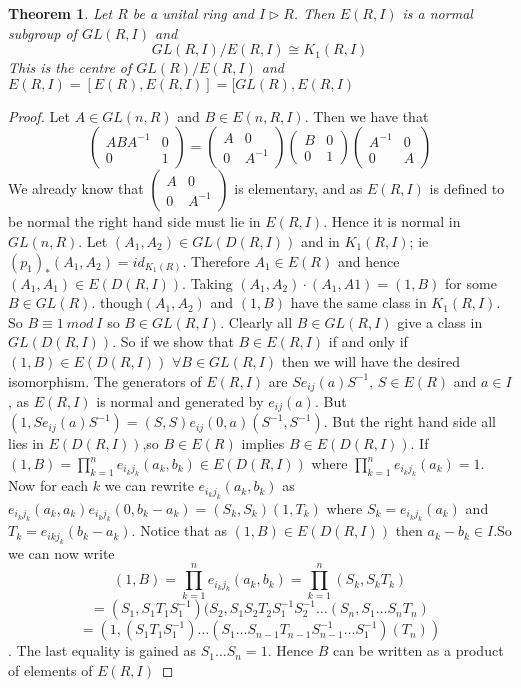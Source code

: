 \documentclass[a4paper,10pt]{article}
\newtheorem{thm}{Theorem}[subsection]
\begin{document}
\begin{thm}
Let $R$ be a unital ring and $I\triangleright R$. Then $E(R,I)$ is a normal subgroup of $GL(R,I)$ and $$GL(R,I)/E(R,I)\cong K_{1}(R,I)$$
This is the centre of $GL(R)/E(R,I)$ and $E(R,I)=[E(R),E(R,I)]=[GL(R),E(R,I)$
\end{thm}
\begin{proof}
Let $A\in GL(n,R)$ and $B\in E(n,R,I)$. Then we have that $$\begin{pmatrix} ABA^{-1} & 0 \\ 0 & 1 \end{pmatrix} = \begin{pmatrix} A & 0 \\ 0 & A^{-1} \end{pmatrix} \begin{pmatrix} B & 0 \\ 0 & 1 \end{pmatrix} \begin{pmatrix} A^{-1} & 0 \\ 0 & A \end{pmatrix}$$
We already know that $\begin{pmatrix} A & 0 \\ 0 & A^{-1} \end{pmatrix}$ is elementary, and as $E(R,I)$ is defined to be normal the right hand side must lie in $E(R,I)$. Hence it is normal in $GL(n,R)$.
\newline Let $(A_{1},A_{2})\in GL(D(R,I))$ and in $K_{1}(R,I)$; ie $(p_{1})_{*}(A_{1},A_{2})=id_{K_{1}(R)}$. Therefore $A_{1}\in E(R)$ and hence $(A_{1},A_{1})\in E(D(R,I))$. Taking $(A_{1},A_{2})\cdot (A_{1},A{1})=(1,B)$ for some $B\in GL(R)$. though$(A_{1},A_{2})$ and $(1,B)$ have the same class in $K_{1}(R,I)$. So $B\equiv 1\ mod\ I$ so $B\in GL(R,I)$. Clearly all $B\in GL(R,I)$ give a class in $GL(D(R,I))$. So if we show that $B\in E(R,I)$ if and only if $(1,B)\in E(D(R,I))$ $\forall B\in GL(R,I)$ then we will have the desired isomorphism.
\newline The generators of $E(R,I)$ are $Se_{ij}(a)S^{-1}$, $S\in E(R)$ and $a\in I$, as $E(R,I)$ is normal and generated by $e_{ij}(a)$. But $(1,Se_{ij}(a)S^{-1})=(S,S)e_{ij}(0,a)(S^{-1},S^{-1})$. But the right hand side all lies in $E(D(R,I))$,so $B\in E(R)$ implies $B\in E(D(R,I))$.
\newline If $(1,B)=\prod_{k=1}^{n}e_{i_{k}j_{k}}(a_{k},b_{k})\in E(D(R,I))$ where $\prod_{k=1}^{n}e_{i_{k}j_{k}}(a_{k})=1$.
Now for each $k$ we can rewrite $e_{i_{k}j_{k}}(a_{k},b_{k})$ as $e_{i_{k}j_{k}}(a_{k},a_{k})e_{i_{k}j_{k}}(0,b_{k}-a_{k})=(S_{k},S_{k})(1,T_{k})$ where $S_{k}=e_{i_{k}j_{k}}(a_{k})$ and $T_{k}=e_{i{k}j_{k}}(b_{k}-a_{k})$. Notice that as $(1,B)\in E(D(R,I))$ then $a_{k}-b_{k}\in I$.So we can now write $$(1,B)=\prod_{k=1}^{n}e_{i_{k}j_{k}}(a_{k},b_{k})=\prod_{k=1}^{n}(S_{k},S_{k}T_{k})$$ $$=(S_{1},S_{1}T_{1}S_{1}^{-1})(S_{2},S_{1}S_{2}T_{2}S_{1}^{-1}S_{2}^{-1}\ldots (S_{n},S_{1}\ldots S_{n}T_{n})$$ $$=(1,(S_{1}T_{1}S_{1}^{-1})\ldots (S_{1}\ldots S_{n-1}T_{n-1}S_{n-1}^{-1}\ldots S_{1}^{-1})(T_{n}))$$. The last equality is gained as $S_{1}\ldots S_{n}=1$. Hence $B$ can be written as a product of elements of $E(R,I)$

\end{proof}
\end{document}
